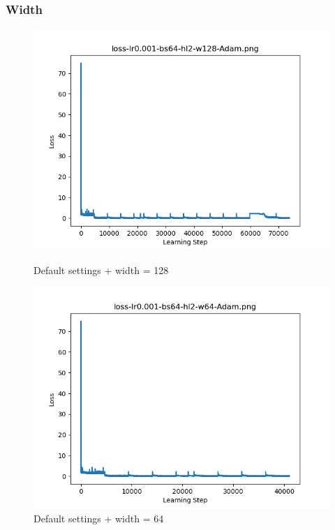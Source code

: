 \documentclass{article}[12pt]
\begin{document}
\subsubsection{Width}

    \begin{figure}[H]
        \includegraphics[width=\linewidth]{testsResults/loss/w/def.png}
        \caption{Default settings + width = 128}
        \endminipage\hfill
        \includegraphics[width=\linewidth]{testsResults/loss/w/loss-lr0.001-bs64-hl2-w64-Adam.png}
        \caption{Default settings + width = 64}
        \endminipage
    \end{figure}
\end{document}
